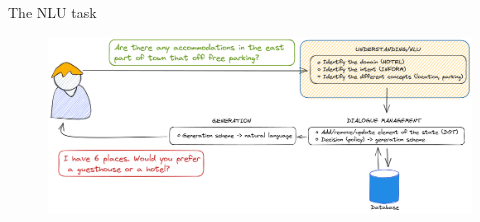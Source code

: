\documentclass[10pt,aspectratio=169]{beamer}
\begin{document}
\begin{frame}{The NLU task}
    \begin{figure}
        \centering
        \includegraphics[width=1.\textwidth]{media/dialogue_task_complete_nlu.png}
    \end{figure}
\end{frame}
\end{document}
